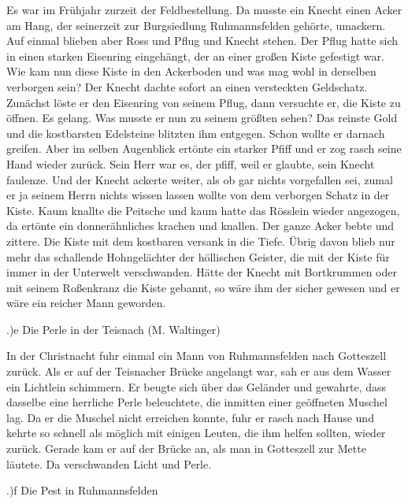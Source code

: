 Es war im Frühjahr zurzeit der Feldbestellung. Da musste ein Knecht einen Acker
am Hang, der seinerzeit zur Burgsiedlung Ruhmannsfelden gehörte, umackern. Auf
einmal blieben aber Ross und Pflug und Knecht stehen. Der Pflug hatte sich in
einen starken Eisenring eingehängt, der an einer großen Kiste gefestigt war. Wie
kam nun diese Kiste in den Ackerboden und was mag wohl in derselben verborgen
sein? Der Knecht dachte sofort an einen versteckten Geldschatz. Zunächst löste
er den Eisenring von seinem Pflug, dann versuchte er, die Kiste zu öffnen. Es
gelang. Was musste er nun zu seinem größten sehen? Das reinste Gold und die
kostbarsten Edelsteine blitzten ihm entgegen. Schon wollte er darnach greifen.
Aber im selben Augenblick ertönte ein starker Pfiff und er zog rasch seine Hand
wieder zurück. Sein Herr war es, der pfiff, weil er glaubte, sein Knecht
faulenze. Und der Knecht ackerte weiter, als ob gar nichts vorgefallen sei,
zumal er ja seinem Herrn nichts wissen lassen wollte von dem verborgen Schatz in
der Kiste. Kaum knallte die Peitsche und kaum hatte das Rösslein wieder
angezogen, da ertönte ein donnerähnliches krachen und knallen. Der ganze Acker
bebte und zittere. Die Kiste mit dem kostbaren versank in die Tiefe. Übrig davon
blieb nur mehr das schallende Hohngelächter der höllischen Geister, die mit der
Kiste für immer in der Unterwelt verschwanden. Hätte der Knecht mit Bortkrummen
oder mit seinem Roßenkranz die Kiste gebannt, so wäre ihm der sicher gewesen und
er wäre ein reicher Mann geworden.

.)e Die Perle in der Teisnach (M. Waltinger)

In der Christnacht fuhr einmal ein Mann von Ruhmannsfelden nach Gotteszell
zurück. Als er auf der Teisnacher Brücke angelangt war, sah er aus dem Wasser
ein Lichtlein schimmern. Er beugte sich über das Geländer und gewahrte, dass
dasselbe eine herrliche Perle beleuchtete, die inmitten einer geöffneten Muschel
lag. Da er die Muschel nicht erreichen konnte, fuhr er rasch nach Hause und
kehrte so schnell als möglich mit einigen Leuten, die ihm helfen sollten, wieder
zurück. Gerade kam er auf der Brücke an, als man in Gotteszell zur Mette
läutete. Da verschwanden Licht und Perle.

.)f Die Pest in Ruhmannsfelden

